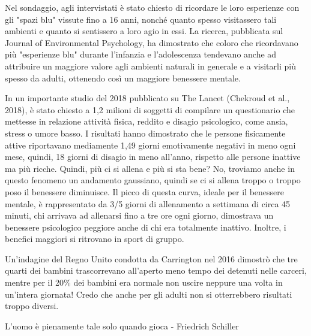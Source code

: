 \documentclass[12pt]{book} %
\begin{document}
\begin{mdframed}[linewidth=1pt]
Nel sondaggio, agli intervistati è stato chiesto di ricordare le loro esperienze con gli "spazi blu" vissute fino a 16 anni, nonché quanto spesso visitassero tali ambienti e quanto si sentissero a loro agio in essi. La ricerca, pubblicata sul Journal of Environmental Psychology, ha dimostrato che coloro che ricordavano più "esperienze blu" durante l'infanzia e l'adolescenza tendevano anche ad attribuire un maggiore valore agli ambienti naturali in generale e a visitarli più spesso da adulti, ottenendo così un maggiore benessere mentale.

\bigskip

In un importante studio del 2018 pubblicato su The Lancet (Chekroud et al.,
2018), è stato chiesto a 1,2 milioni
di soggetti di compilare un questionario che mettesse in relazione attività fisica, reddito e disagio psicologico, come
ansia, stress o umore basso. I risultati hanno dimostrato che le persone fisicamente attive riportavano mediamente 1,49
giorni emotivamente negativi in meno ogni mese, quindi, 18 giorni di disagio in meno all'anno,
rispetto alle persone inattive ma più ricche. Quindi, più ci si allena e più si sta bene? No, troviamo anche in questo
fenomeno un andamento gaussiano, quindi se ci si allena troppo o troppo poso il benessere diminuisce. Il picco di
questa curva, ideale per il benessere mentale, è rappresentato da 3/5 giorni di allenamento a settimana di circa 45
minuti, chi arrivava ad allenarsi fino a tre ore ogni giorno, dimostrava un benessere psicologico peggiore anche di chi
era totalmente inattivo. Inoltre, i benefici maggiori si ritrovano in sport di gruppo.


\bigskip

Un'indagine del Regno Unito condotta da Carrington nel 2016 dimostrò che tre quarti dei bambini
trascorrevano all'aperto meno tempo dei detenuti nelle carceri, mentre per il 20\% dei bambini era
normale non uscire neppure una volta in un'intera giornata! Credo che anche per gli adulti non si
otterrebbero risultati troppo diversi.


\bigskip

L'uomo è pienamente tale solo quando gioca - Friedrich Schiller 


\bigskip


\end{mdframed}
\end{document}
